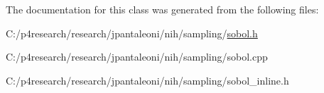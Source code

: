\-The documentation for this class was generated from the following files\-:\begin{DoxyCompactItemize}
\item 
\-C\-:/p4research/research/jpantaleoni/nih/sampling/\hyperlink{sobol_8h}{sobol.\-h}\item 
\-C\-:/p4research/research/jpantaleoni/nih/sampling/sobol.\-cpp\item 
\-C\-:/p4research/research/jpantaleoni/nih/sampling/sobol\-\_\-inline.\-h\end{DoxyCompactItemize}

